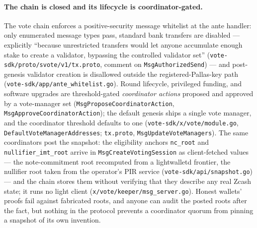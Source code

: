 \documentclass[11pt,a4paper]{article}
\theoremstyle{definition}
\begin{document}
\paragraph{The chain is closed and its lifecycle is coordinator-gated.}
The vote chain enforces a positive-security message whitelist at the ante
handler: only enumerated message types pass, standard bank transfers are
disabled --- explicitly ``because unrestricted transfers would let anyone
accumulate enough stake to create a validator, bypassing the controlled
validator set'' (\texttt{vote-sdk/proto/svote/v1/tx.proto}, comment on
\texttt{MsgAuthorizedSend}) --- and post-genesis validator creation is
disallowed outside the registered-Pallas-key path
(\texttt{vote-sdk/app/ante\_whitelist.go}). Round lifecycle, privileged
funding, and software upgrades are threshold-gated \emph{coordinator
actions} proposed and approved by a vote-manager set
(\texttt{MsgProposeCoordinatorAction}, \texttt{MsgApproveCoordinatorAction});
the default genesis ships a single vote manager, and the coordinator
threshold defaults to one (\texttt{vote-sdk/x/vote/module.go},
\texttt{DefaultVoteManagerAddresses}; \texttt{tx.proto},
\texttt{MsgUpdateVoteManagers}).
The same coordinators post the snapshot: the eligibility anchors
\texttt{nc\_root} and \texttt{nullifier\_imt\_root} arrive in
\texttt{MsgCreateVotingSession} as client-fetched values --- the
note-commitment root recomputed from a lightwalletd frontier, the
nullifier root taken from the operator's PIR service
(\texttt{vote-sdk/api/snapshot.go}) --- and the chain stores them without
verifying that they describe any real Zcash state; it runs no light
client (\texttt{x/vote/keeper/msg\_server.go}). Honest wallets' proofs
fail against fabricated roots, and anyone can audit the posted roots
after the fact, but nothing in the protocol prevents a coordinator quorum
from pinning a snapshot of its own invention.
\end{document}
